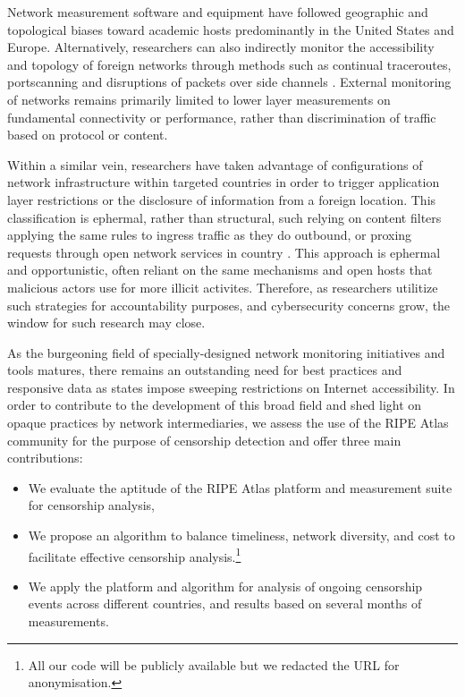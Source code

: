 Network measurement software and equipment have followed geographic and topological biases toward academic hosts predominantly in the United States and Europe. Alternatively, researchers can also indirectly monitor the accessibility and topology of foreign networks through methods such as continual traceroutes, portscanning and disruptions of packets over side channels \cite{ensafi2010idle}. External monitoring of networks remains primarily limited to lower layer measurements on fundamental connectivity or performance, rather than discrimination of traffic based on protocol or content. 

Within a similar vein, researchers have taken advantage of configurations of network infrastructure within targeted countries in order to trigger application layer restrictions or the disclosure of information from a foreign location. This classification is ephermal, rather than structural, such relying on content filters applying the same rules to ingress traffic as they do outbound, or proxing requests through open network services in country \cite{wright2011fine}. This approach is ephermal and opportunistic, often reliant on the same mechanisms and open hosts that malicious actors use for more illicit activites. Therefore, as researchers utilitize such strategies for accountability purposes, and cybersecurity concerns grow, the window for such research may close.

As the burgeoning field of specially-designed network monitoring initiatives and tools matures, there remains an outstanding need for best practices and responsive data as states impose sweeping restrictions on Internet accessibility. In order to contribute to the development of this broad field and shed light on opaque practices by network intermediaries, we assess the use of the RIPE Atlas community for the purpose of censorship detection and offer three main contributions:

\begin{itemize}
	\item We evaluate the aptitude of the RIPE Atlas platform and measurement suite for censorship analysis,
	\item We propose an algorithm to balance timeliness, network diversity, and cost to facilitate effective censorship analysis.\footnote{All our
	code will be publicly available but we redacted the URL for anonymisation.}
	\item We apply the platform and algorithm for analysis of ongoing censorship events across different countries, and results based on several months of measurements.
\end{itemize}

